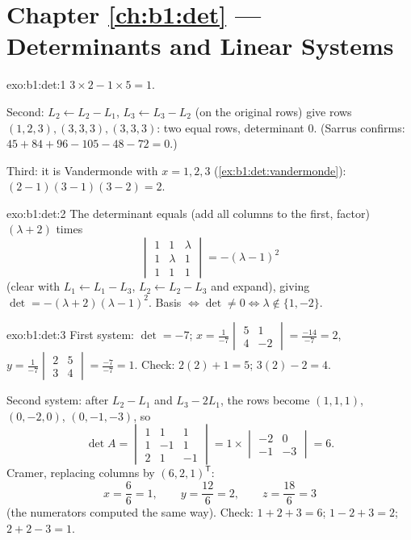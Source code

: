 \section*{Chapter \ref{ch:b1:det} --- Determinants and Linear Systems}

\begin{solution}{exo:b1:det:1}
$3 \times 2 - 1 \times 5 = 1$.

Second: $L_2 \leftarrow L_2 - L_1$, $L_3 \leftarrow L_3 - L_2$ (on
the original rows) give rows $(1,2,3), (3,3,3), (3,3,3)$: two equal
rows, determinant $0$. (Sarrus confirms: $45 + 84 + 96 - 105 - 48 -
72 = 0$.)

Third: it is Vandermonde with $x = 1, 2, 3$
(\cref{ex:b1:det:vandermonde}): $(2-1)(3-1)(3-2) = 2$.
\end{solution}

\begin{solution}{exo:b1:det:2}
The determinant equals (add all columns to the first, factor)
$(\lambda + 2)$ times
\[
\begin{vmatrix}
1 & 1 & \lambda\\ 1 & \lambda & 1\\ 1 & 1 & 1
\end{vmatrix}
= -(\lambda - 1)^2
\]
(clear with $L_1 \leftarrow L_1 - L_3$, $L_2 \leftarrow L_2 - L_3$
and expand), giving $\det = -(\lambda+2)(\lambda-1)^2$. Basis
$\iff \det \neq 0 \iff \lambda \notin \{1, -2\}$.
\end{solution}

\begin{solution}{exo:b1:det:3}
First system: $\det = -7$;
$x = \frac{1}{-7}\begin{vmatrix} 5 & 1\\ 4 & -2\end{vmatrix}
= \frac{-14}{-7} = 2$,
$y = \frac{1}{-7}\begin{vmatrix} 2 & 5\\ 3 & 4\end{vmatrix}
= \frac{-7}{-7} = 1$. Check: $2(2) + 1 = 5$; $3(2) - 2 = 4$.

Second system: after $L_2 - L_1$ and $L_3 - 2L_1$, the rows become
$(1,1,1)$, $(0,-2,0)$, $(0,-1,-3)$, so
\[
\det A = \begin{vmatrix} 1&1&1\\ 1&-1&1\\ 2&1&-1\end{vmatrix}
= 1 \times \begin{vmatrix} -2 & 0\\ -1 & -3\end{vmatrix} = 6 .
\]
Cramer, replacing columns by $(6,2,1)^{\mathsf T}$:
\[
x = \frac{6}{6} = 1, \qquad
y = \frac{12}{6} = 2, \qquad
z = \frac{18}{6} = 3
\]
(the numerators computed the same way). Check: $1 + 2 + 3 = 6$; $1 -
2 + 3 = 2$; $2 + 2 - 3 = 1$.
\end{solution}

